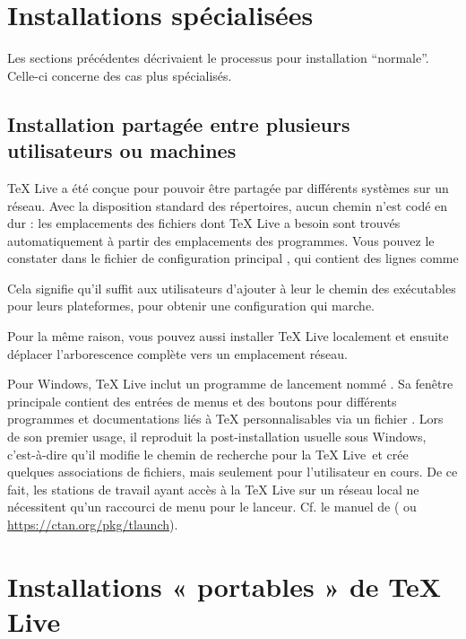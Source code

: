 \documentclass[german, english, french, 12pt]{article}
\renewcommand{\TL}{\TeX{} Live\xspace}%
\begin{document}
\section{Installations spécialisées}

Les sections précédentes décrivaient le processus pour installation
\enquote{normale}. Celle-ci concerne des cas plus spécialisés.

\subsection{Installation partagée entre plusieurs utilisateurs ou machines}
\label{sec:sharedinstall}

\TL a été conçue pour pouvoir être partagée par différents systèmes sur un
réseau.  Avec la disposition standard des répertoires, aucun chemin n'est codé
en dur : les emplacements des fichiers dont \TL a besoin sont trouvés
automatiquement à partir des emplacements des programmes. Vous pouvez le
constater dans le fichier de configuration principal
, %
qui contient des lignes comme
Cela signifie qu'il suffit aux utilisateurs d'ajouter à leur  le
chemin des exécutables pour leurs plateformes, pour obtenir une configuration
qui marche.

Pour la même raison, vous pouvez aussi installer \TL localement et ensuite
déplacer l'arborescence complète vers un emplacement réseau.

Pour Windows, \TL{} inclut un programme de lancement nommé
. Sa fenêtre principale contient des entrées de menus et des
boutons pour différents programmes et documentations liés à \TeX{}
personnalisables via un fichier . Lors de son premier usage, il
reproduit la post-installation usuelle sous Windows, c'est-à-dire qu'il modifie
le chemin de recherche pour la \TL\ et crée quelques associations de fichiers,
mais seulement pour l'utilisateur en cours. De ce fait, les stations de travail
ayant accès à la \TL{} sur un réseau local ne nécessitent qu'un raccourci de
menu pour le lanceur. Cf. le manuel de  ( ou
\url{https://ctan.org/pkg/tlaunch}).

\section{Installations « portables » de \protect\TL}
\label{sec:portable-tl}
\end{document}
